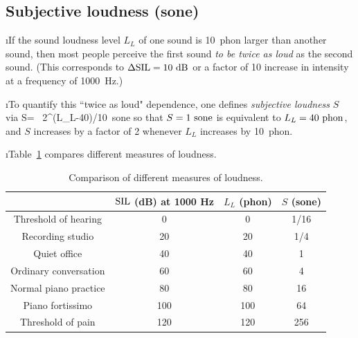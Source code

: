 \ei
\subsection{Subjective loudness (sone)}
\bi

\i If the sound loudness level $L_L$ of one sound is 
10~phon larger than another sound, then most people 
perceive the first sound {\em to be twice as loud} as 
the second sound.  
(This corresponds to $\Delta{\rm SIL}=10~{\rm dB}$ 
or a factor of 10 increase in intensity at a frequency
of 1000~Hz.)

\i To quantify this ``twice as loud" dependence, one 
defines {\em subjective loudness} $S$ via
%
\be
S= \, 2^{(L_L-40)/10}~{\rm sone}
\ee
%
so that $S=1~{\rm sone}$ is equivalent to $L_L=40~{\rm phon}$,
and $S$ increases by a factor of 2 whenever $L_L$ increases
by 10~phon.

\i Table~\ref{t:loudnesslevels} compares different 
measures of loudness.
%
\begin{table}[htbp]
\begin{center}
\begin{tabular}{|c|c|c|c|}
\hline
& ${\rm SIL}$ (dB) at 1000 Hz & $L_L$ (phon) & $S$ (sone) \\
\hline
Threshold of hearing & 0 & 0 & 1/16 \\
Recording studio & 20 & 20 & 1/4 \\
Quiet office & 40 & 40 & 1 \\
Ordinary conversation & 60 & 60 & 4 \\
Normal piano practice & 80 & 80 & 16 \\
Piano fortissimo & 100 & 100 & 64 \\
Threshold of pain & 120 & 120 & 256 \\
\hline
\end{tabular}
\caption{Comparison of different measures of loudness.}
\label{t:loudnesslevels}
\end{center}
\end{table}

